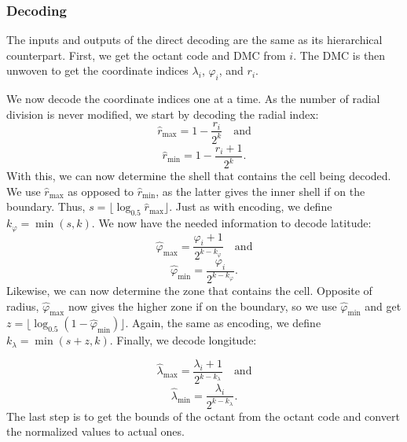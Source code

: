 \subsubsection{Decoding}
The inputs and outputs of the direct decoding are the same as its hierarchical counterpart.
First, we get the octant code and DMC from $i$.
The DMC is then unwoven to get the coordinate indices $\lambda_i$, $\varphi_i$, and $r_i$.


We now decode the coordinate indices one at a time.
As the number of radial division is never modified, we start by decoding the radial index: 
%
\begin{equation*}
\hat{r}_\mathrm{max} = 1 - \frac{r_i}{2^k} \quad \text{and}
\end{equation*}
%
\begin{equation*}
\hat{r}_\mathrm{min} = 1 - \frac{r_i + 1}{2^k}.
\end{equation*}
%
With this, we can now determine the shell that contains the cell being decoded.
We use $\hat{r}_\mathrm{max}$ as opposed to $\hat{r}_\mathrm{min}$, as the latter gives the inner shell if on the boundary. Thus, $s = \lfloor \log_{0.5} \hat{r}_\mathrm{max} \rfloor$.
Just as with encoding, we define $k_\varphi = \min ( s, k )$.
We now have the needed information to decode latitude:
%
\begin{equation*}
\hat{\varphi}_\mathrm{max} = \frac{\varphi_i + 1}{2^{k - k_\varphi}} \quad \text{and}
\end{equation*}
%
\begin{equation*}
\hat{\varphi}_\mathrm{min} = \frac{\varphi_i}{2^{k - k_\varphi}}.
\end{equation*}
%
Likewise, we can now determine the zone that contains the cell.
Opposite of radius, $\hat{\varphi}_\mathrm{max}$ now gives the higher zone if on the boundary, so we use $\hat{\varphi}_\mathrm{min}$ and get $z = \lfloor \log_{0.5} ( 1 - \hat{\varphi}_\mathrm{min} ) \rfloor$.
Again, the same as encoding, we define $k_\lambda = \min ( s + z, k )$.
Finally, we decode longitude:


\begin{equation*}
\hat{\lambda}_\mathrm{max} = \frac{\lambda_i + 1}{2^{k - k_\lambda}} \quad \text{and}
\end{equation*}
%
\begin{equation*}
\hat{\lambda}_\mathrm{min} = \frac{\lambda_i}{2^{k - k_\lambda}}.
\end{equation*}
%
The last step is to get the bounds of the octant from the octant code and convert the normalized values to actual ones.


